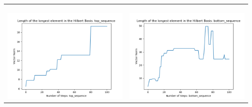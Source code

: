 \documentclass[10pt]{article}
\begin{document}
\begin{tabular}{c|c}
\begin{minipage}{.45\textwidth}
\end{minipage} \\ \\
\hline \\
\begin{minipage}{.45\textwidth}
\includegraphics[width=\textwidth]{"DATA/5d/6 generators 2 bound A alternating/top_sequence LENGTH"}
\end{minipage} &
\begin{minipage}{.45\textwidth}
\includegraphics[width=\textwidth]{"DATA/5d/6 generators 2 bound A alternating/bottom_sequence LENGTH"}
\end{minipage}
\end{tabular}
\end{document}
